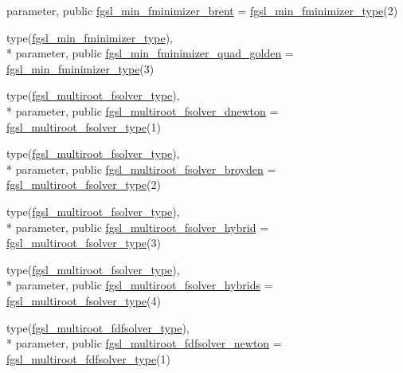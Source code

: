 \begin{DoxyCompactItemize}
parameter, public \hyperlink{classfgsl_a0434a8f5d054ed9038714a856f8937ad}{fgsl\-\_\-min\-\_\-fminimizer\-\_\-brent} = \hyperlink{structfgsl_1_1fgsl__min__fminimizer__type}{fgsl\-\_\-min\-\_\-fminimizer\-\_\-type}(2)
\item 
type(\hyperlink{structfgsl_1_1fgsl__min__fminimizer__type}{fgsl\-\_\-min\-\_\-fminimizer\-\_\-type}), \\*
parameter, public \hyperlink{classfgsl_a7c479328d8e7e7d55f2fa4908d0122c9}{fgsl\-\_\-min\-\_\-fminimizer\-\_\-quad\-\_\-golden} = \hyperlink{structfgsl_1_1fgsl__min__fminimizer__type}{fgsl\-\_\-min\-\_\-fminimizer\-\_\-type}(3)
\item 
type(\hyperlink{structfgsl_1_1fgsl__multiroot__fsolver__type}{fgsl\-\_\-multiroot\-\_\-fsolver\-\_\-type}), \\*
parameter, public \hyperlink{classfgsl_a1621295c3bf584aab577fe54f3a89fb0}{fgsl\-\_\-multiroot\-\_\-fsolver\-\_\-dnewton} = \hyperlink{structfgsl_1_1fgsl__multiroot__fsolver__type}{fgsl\-\_\-multiroot\-\_\-fsolver\-\_\-type}(1)
\item 
type(\hyperlink{structfgsl_1_1fgsl__multiroot__fsolver__type}{fgsl\-\_\-multiroot\-\_\-fsolver\-\_\-type}), \\*
parameter, public \hyperlink{classfgsl_aaa51198ecabbc2cc4e7cd469492acedc}{fgsl\-\_\-multiroot\-\_\-fsolver\-\_\-broyden} = \hyperlink{structfgsl_1_1fgsl__multiroot__fsolver__type}{fgsl\-\_\-multiroot\-\_\-fsolver\-\_\-type}(2)
\item 
type(\hyperlink{structfgsl_1_1fgsl__multiroot__fsolver__type}{fgsl\-\_\-multiroot\-\_\-fsolver\-\_\-type}), \\*
parameter, public \hyperlink{classfgsl_acca2b12319b40798b2dc4dd347fcc4b5}{fgsl\-\_\-multiroot\-\_\-fsolver\-\_\-hybrid} = \hyperlink{structfgsl_1_1fgsl__multiroot__fsolver__type}{fgsl\-\_\-multiroot\-\_\-fsolver\-\_\-type}(3)
\item 
type(\hyperlink{structfgsl_1_1fgsl__multiroot__fsolver__type}{fgsl\-\_\-multiroot\-\_\-fsolver\-\_\-type}), \\*
parameter, public \hyperlink{classfgsl_abd283e94024c75208f98eb64fd4a8833}{fgsl\-\_\-multiroot\-\_\-fsolver\-\_\-hybrids} = \hyperlink{structfgsl_1_1fgsl__multiroot__fsolver__type}{fgsl\-\_\-multiroot\-\_\-fsolver\-\_\-type}(4)
\item 
type(\hyperlink{structfgsl_1_1fgsl__multiroot__fdfsolver__type}{fgsl\-\_\-multiroot\-\_\-fdfsolver\-\_\-type}), \\*
parameter, public \hyperlink{classfgsl_ae80cc34511a1cc786b0fb5617e3929ed}{fgsl\-\_\-multiroot\-\_\-fdfsolver\-\_\-newton} = \hyperlink{structfgsl_1_1fgsl__multiroot__fdfsolver__type}{fgsl\-\_\-multiroot\-\_\-fdfsolver\-\_\-type}(1)

\end{DoxyCompactItemize}

